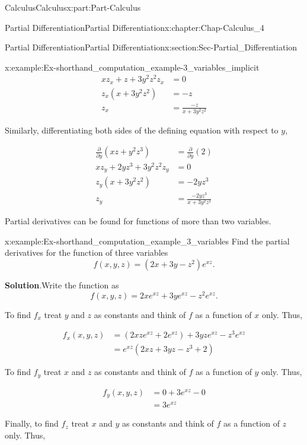 \documentclass[oneside,10pt,]{book}
\newcommand{\blocktitlefont}{\relax}
\numberwithin{equation}{section}
\newcommand{\amp}{&}
\begin{document}
\begin{partptx}{Calculus}{}{Calculus}{}{}{x:part:Part-Calculus}
\begin{chapterptx}{Partial Differentiation}{}{Partial Differentiation}{}{}{x:chapter:Chap-Calculus_4}
\begin{sectionptx}{Partial Differentiation}{}{Partial Differentiation}{}{}{x:section:Sec-Partial_Differentiation}
\begin{example}{}{x:example:Ex-shorthand_computation_example-3_variables_implicit}
\begin{align*}
xz_x + z + 3y^2 z^2 z_x \amp = 0\\
z_x (x+3y^2 z^2) \amp = -z\\
z_x \amp = \frac{-z}{x+3y^2 z^2}
\end{align*}
%
\par
Similarly, differentiating both sides of the defining equation with respect to \(y\),%
\par
%
\begin{align*}
\frac{\partial}{\partial y} \left(xz + y^2z^3 \right) \amp = \frac{\partial}{\partial y} (2)\\
xz_y + 2yz^3 + 3y^2 z^2 z_y \amp = 0\\
z_y (x+3y^2 z^2) \amp = -2yz^3\\
z_y \amp = \frac{-2yz^3}{x+3y^2 z^2}
\end{align*}
%
\end{example}
Partial derivatives can be found for functions of more than two variables.%
\begin{example}{}{x:example:Ex-shorthand_computation_example_3_variables}%
Find the partial derivatives for the function of three variables%
\begin{equation*}
f(x,y,z) = (2x+3y-z^2)e^{xz}\text{.}
\end{equation*}
%
\par\smallskip%
\noindent\textbf{\blocktitlefont Solution}.\hypertarget{g:solution:id546335}{}\quad{}Write the function as%
\begin{equation*}
f(x,y,z) = 2xe^{xz} + 3ye^{xz} - z^2 e^{xz}\text{.}
\end{equation*}
%
\par
To find \(f_x\) treat \(y\) and \(z\) as constants and think of \(f\) as a function of \(x\) only. Thus,%
\par
%
\begin{align*}
f_x(x,y,z) \amp = (2xz e^{xz} + 2e^{xz} ) + 3yze^{xz} - z^3 e^{xz}\\
\amp = e^{xz} (2xz + 3yz - z^3 + 2)
\end{align*}
%
\par
To find \(f_y\) treat \(x\) and \(z\) as constants and think of \(f\) as a function of \(y\) only. Thus,%
\par
%
\begin{align*}
f_y(x,y,z) \amp = 0 + 3e^{xz} - 0\\
\amp = 3e^{xz}
\end{align*}
%
\par
Finally, to find \(f_z\) treat \(x\) and \(y\) as constants and think of \(f\) as a function of \(z\) only. Thus,%

\end{example}
\end{sectionptx}
\end{chapterptx}
\end{partptx}
\end{document}
